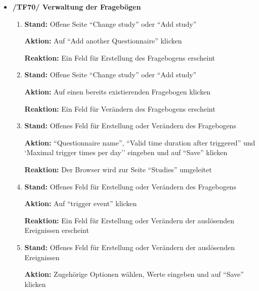 \documentclass[a4paper]{scrreprt}
\begin{document}
\begin{itemize}
		                      \item \textbf{/TF70/ Verwaltung der Frageb\"ogen}
		                          \begin{enumerate}
		                              \item \par \textbf{Stand: }Offene Seite ``Change study'' oder ``Add study''
		                                    \par \textbf{Aktion: }Auf ``Add another Questionnaire'' klicken
		                                    \par \textbf{Reaktion: }Ein Feld f\"ur Erstellung des Fragebogens erscheint
		      						\item \par \textbf{Stand: }Offene Seite ``Change study'' oder ``Add study''
		                                    \par \textbf{Aktion: }Auf einen bereits existierenden Fragebogen klicken
		                                    \par \textbf{Reaktion: }Ein Feld f\"ur Ver\"andern des Fragebogens erscheint
		                              \item \par \textbf{Stand: }Offenes Feld f\"ur Erstellung oder Ver\"andern des Fragebogens
		                                    \par \textbf{Aktion: }``Questionnaire name'', ``Valid time duration after triggered'' und `Maximal trigger times per day'' eingeben und auf ``Save'' klicken
		                                    \par \textbf{Reaktion: }Der Browser wird zur Seite ``Studies'' umgeleitet
		                              \item \par \textbf{Stand: }Offenes Feld f\"ur Erstellung oder Ver\"andern des Fragebogens
		                                    \par \textbf{Aktion: }Auf ``trigger event'' klicken
		                                    \par \textbf{Reaktion: }Ein Feld f\"ur Erstellung oder Ver\"andern der ausl\"osenden Ereignissen erscheint
		                              \item \par \textbf{Stand: }Offenes Feld f\"ur Erstellung oder Ver\"andern der ausl\"osenden Ereignissen
		                                    \par \textbf{Aktion: }Zugeh\"orige Optionen w\"ahlen, Werte eingeben und auf ``Save'' klicken

\end{enumerate}
\end{itemize}
\end{document}
